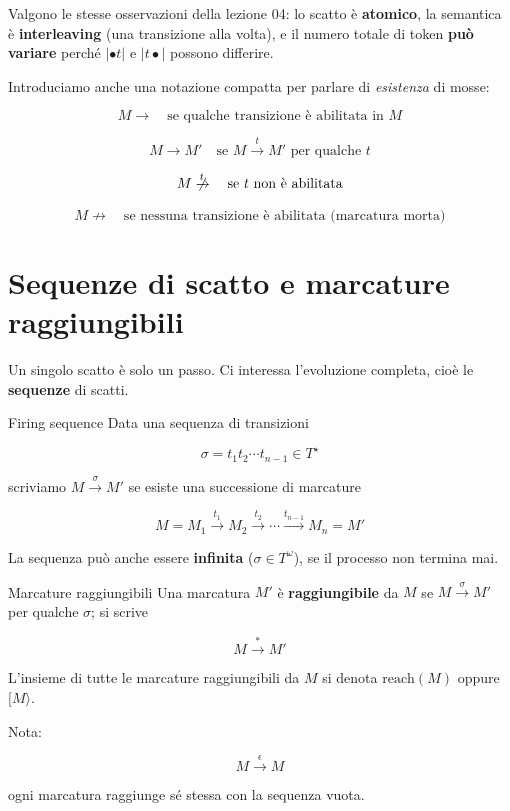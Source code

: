 Valgono le stesse osservazioni della lezione 04: lo scatto è \textbf{atomico}, la semantica è \textbf{interleaving} (una transizione alla volta), e il numero totale di token \textbf{può variare} perché $|\bullet t|$ e $|t\bullet|$ possono differire.

Introduciamo anche una notazione compatta per parlare di \emph{esistenza} di mosse:

\[
M \to \quad \text{se qualche transizione è abilitata in } M
\]

\[
M \to M' \quad \text{se } M \xrightarrow{t} M' \text{ per qualche } t
\]

\[
M \centernot{\xrightarrow{t}} \quad \text{se } t \text{ non è abilitata}
\]

\[
M \not\to \quad \text{se nessuna transizione è abilitata (marcatura morta)}
\]

\section{\texorpdfstring{Sequenze di scatto e marcature raggiungibili}{Sequenze di scatto e marcature raggiungibili}}

Un singolo scatto è solo un passo. Ci interessa l'evoluzione completa, cioè le \textbf{sequenze} di scatti.

\begin{boxdefinition}{Firing sequence}
Data una sequenza di transizioni

\[
\sigma = t_1 t_2 \cdots t_{n-1} \in T^\star
\]

scriviamo $M \xrightarrow{\sigma} M'$ se esiste una successione di marcature

\[
M = M_1 \xrightarrow{t_1} M_2 \xrightarrow{t_2} \cdots \xrightarrow{t_{n-1}} M_n = M'
\]

La sequenza può anche essere \textbf{infinita} ($\sigma \in T^\omega$), se il processo non termina mai.
\end{boxdefinition}

\begin{boxdefinition}{Marcature raggiungibili}
Una marcatura $M'$ è \textbf{raggiungibile} da $M$ se $M \xrightarrow{\sigma} M'$ per qualche $\sigma$; si scrive

\[
M \xrightarrow{\;\ast\;} M'
\]

L'insieme di tutte le marcature raggiungibili da $M$ si denota $\text{reach}(M)$ oppure $[M\rangle$.

Nota:

\[
M \xrightarrow{\epsilon} M
\]

ogni marcatura raggiunge sé stessa con la sequenza vuota.
\end{boxdefinition}

